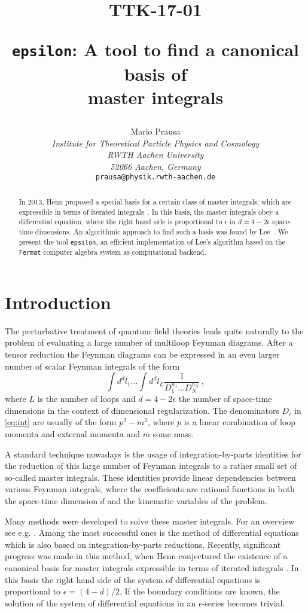 \documentclass[12pt]{article}
\title{\vskip-3cm{\baselineskip14pt
  \begin{flushleft}
      \normalsize TTK-17-01
  \end{flushleft}}
  \vskip1.5cm
	{\tt epsilon}: A tool to find a canonical basis of\\ master integrals
}
\author{\small
  Mario Prausa
  \\[1em]
  {\small \it Institute for Theoretical Particle Physics and Cosmology}\\
  {\small \it RWTH Aachen University}\\
  {\small \it 52066 Aachen, Germany}\\[.5em]
  {\small \tt prausa@physik.rwth-aachen.de}
}
\date{}
\numberwithin{equation}{section}
\numberwithin{figure}{section}
\begin{document}
  \maketitle
  \begin{abstract}
    In 2013, Henn proposed a special basis for a certain class of master integrals, which are expressible in terms of iterated integrals~\cite{Henn:2013pwa}.
    In this basis, the master integrals obey a differential equation, where the right hand side is proportional to $\epsilon$ in $d=4-2\epsilon$ space-time dimensions.
    An algorithmic approach to find such a basis was found by Lee~\cite{Lee:2014ioa}.
    We present the tool \texttt{epsilon}, an efficient implementation of Lee's algorithm based on the \texttt{Fermat} computer algebra system as computational backend.
  \end{abstract}

  \section{Introduction}
    The perturbative treatment of quantum field theories leads quite naturally to the problem of evaluating a large number of multiloop Feynman diagrams.
    After a tensor reduction the Feynman diagrams can be expressed in an even larger number of scalar Feynman integrals of the form
    \begin{equation} \label{eq:int}
      \int d^dl_1 \dots \int d^dl_L \frac1{D_1^{n_1} \dots D_N^{n_N}}\,,
    \end{equation}
    where $L$ is the number of loops and $d=4-2\epsilon$ the number of space-time dimensions in the context of dimensional regularization.
    The denominators $D_i$ in \eqref{eq:int} are usually of the form $p^2 - m^2$, where $p$ is a linear combination of loop momenta and external momenta and $m$ some mass.

    A standard technique nowadays is the usage of integration-by-parts identities \cite{Tkachov:1981wb,Chetyrkin:1981qh} for the reduction of this large number of Feynman integrals to a rather small set of so-called master integrals.
    These identities provide linear dependencies between various Feynman integrals, where the coefficients are rational functions in both the space-time dimension $d$ and the kinematic variables of the problem.

    Many methods were developed to solve these master integrals.
    For an overview see e.g. \cite{Smirnov:2012gma}.
    Among the most successful ones is the method of differential equations which is also based on integration-by-parts reductions\cite{Kotikov:1990kg,Kotikov:1991hm,Kotikov:1991pm}.
    Recently, significant progress was made in this method, when Henn conjectured the existence of a canonical basis for master integrals expressible in terms of iterated integrals \cite{Henn:2013pwa}.
    In this basis the right hand side of the system of differential equations is proportional to $\epsilon = (4-d)/2$.
    If the boundary conditions are known, the solution of the system of differential equations in an $\epsilon$-series becomes trivial.
\end{document}
